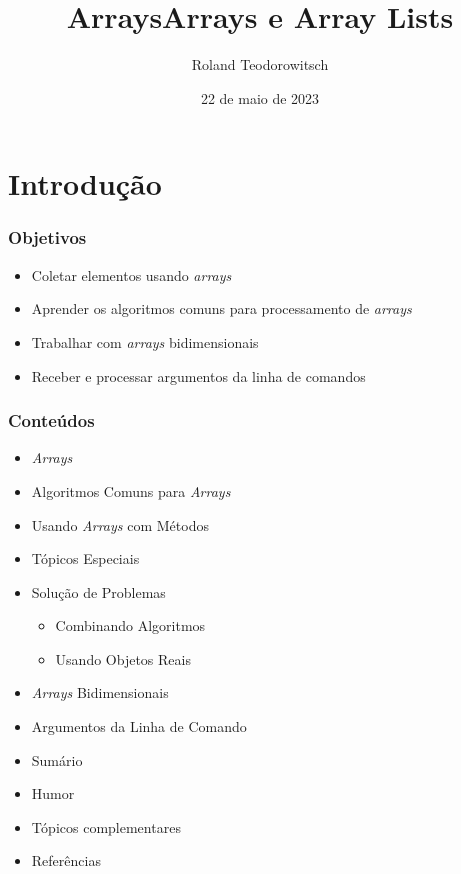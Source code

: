 \documentclass[xcolor={dvipsnames,table},aspectratio=169]{beamer}
\title[\sc{Arrays}]{Arrays}
\title[\sc{Arrays e Array Lists}]{Arrays e Array Lists}
\author[Roland Teodorowitsch]{Roland Teodorowitsch}
\institute[FPROG - EP - PUCRS]{Fundamentos de Programação - Escola Politécnica - PUCRS}
\date{22 de maio de 2023}
\begin{document}
\justifying

\begin{frame}
	\titlepage
\end{frame}

\section{Introdução}

\begin{frame}\frametitle{Objetivos}
\begin{itemize}
	\item Coletar elementos usando \emph{arrays}
	\item Aprender os algoritmos comuns para processamento de \emph{arrays}
	\item Trabalhar com \emph{arrays} bidimensionais
	\item Receber e processar argumentos da linha de comandos
\end{itemize}
\end{frame}

\begin{frame}\frametitle{Conteúdos}
\begin{itemize}
	\item \emph{Arrays}
	\item Algoritmos Comuns para \emph{Arrays}
	\item Usando \emph{Arrays} com Métodos
	\item Tópicos Especiais
	\item Solução de Problemas
	\begin {itemize}
		\item Combinando Algoritmos
		\item Usando Objetos Reais
	\end{itemize}
	\item \emph{Arrays} Bidimensionais
	\item Argumentos da Linha de Comando
	\item Sumário
	\item Humor
	\item Tópicos complementares
	\item Referências
\end{itemize}
\end{frame}
\end{document}
